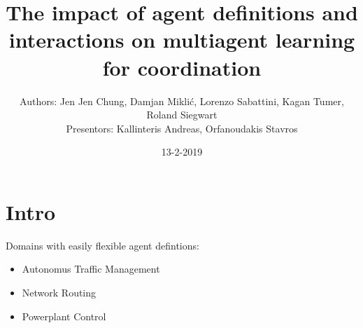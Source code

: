 \documentclass{beamer}
\title{The impact of agent definitions and interactions on multiagent learning for coordination} %
\author{Authors: Jen Jen Chung, Damjan Miklić, Lorenzo Sabattini, Kagan Tumer, Roland Siegwart
\\ Presentors: Kallinteris Andreas, Orfanoudakis Stavros}
\date{13-2-2019} %
\begin{document}
	\begin{frame}
		\maketitle %
	\end{frame}

	\section{Intro}
	\begin{frame}
		Domains with easily flexible agent defintions:
		\begin{itemize}
			\item Autonomus Traffic Management
			\item Network Routing
			\item Powerplant Control
		\end{itemize}
	\end{frame}
\end{document}
